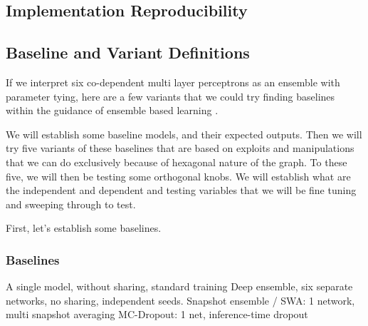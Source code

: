 \subsection{Implementation Reproducibility}


\subsection{Baseline and Variant Definitions}


If we interpret six co-dependent multi layer perceptrons as an ensemble with parameter tying, here are a few variants that we could try finding baselines within the guidance of ensemble based learning \cite{lakshminarayanan2017deep,huang2017snapshot,izmailov2018swa,gal2016dropout}.

We will establish some baseline models, and their expected outputs.
Then we will try five variants of these baselines that are based on exploits and manipulations that we can do exclusively because of hexagonal nature of the graph.
To these five, we will then be testing some orthogonal knobs.  We will establish what are the independent and dependent  and testing variables that we will be fine tuning and sweeping through to test.

First, let's establish some baselines.

\subsubsection{Baselines}

A single model, without sharing, standard training
Deep ensemble, six separate networks, no sharing, independent seeds.
Snapshot ensemble / SWA: 1 network, multi snapshot averaging
MC-Dropout: 1 net, inference-time dropout



